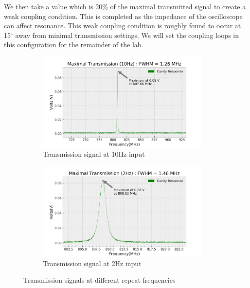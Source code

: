 We then take a value which is 20\% of the maximal transmitted signal to create a weak coupling condition. This is completed as the impedance of the oscilloscope can affect resonance. This weak coupling condition is roughly found to occur at 15$^\circ$ away from minimal transmission settings. We will set the coupling loops in this configuration for the remainder of the lab.

\begin{figure}[h!]
\centering
\begin{subfigure}[t]{.475\textwidth}
  \centering
  \includegraphics[width=0.95\textwidth]{figures/PartB/scope_10.png}
  \caption{Transmission signal at 10Hz input}
 \label{fig:B_trans_10}
\end{subfigure}\hfill
\begin{subfigure}[t]{.475\textwidth}
  \centering
  \includegraphics[width=0.95\textwidth]{figures/PartB/scope_8.png}
  \caption{Transmission signal at 2Hz input}
\label{fig:B_trans_2}
\end{subfigure}
\caption{Transmission signals at different repeat frequencies}
\label{fig:B_trans}
\end{figure}

